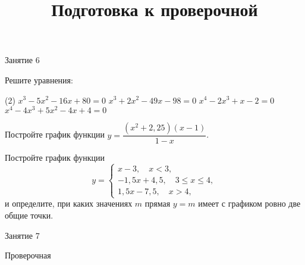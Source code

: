 \begin{class}[number=6]
	\begin{listofex}
		\item Занятие 6
	\end{listofex}
\end{class}

\begin{homework}[number=3]
	\begin{listofex}
		\item Решите уравнения:
		\begin{tasks}(2)
			\task \( x^3-5x^2-16x+80=0 \)
			\task \( x^3+2x^2-49x-98=0 \)
			\task \( x^4-2x^3+x-2=0 \)
			\task \( x^4-4x^3+5x^2-4x+4=0 \)
		\end{tasks}
		\item Постройте график функции \( y=\dfrac{(x^2+2,25)(x-1)}{1-x} \).
		\item Постройте график функции
		\[y= \left\{
		\begin{array}{l}
			x-3, \quad x<3,\\
			-1,5x+4,5,\quad 3\le x\le4,\\
			1,5x-7,5, \quad x>4,
		\end{array}
		\right.\]
		и определите, при каких значениях \( m \) прямая \( y=m \) имеет с графиком ровно две общие точки.
	\end{listofex}
\end{homework}

\begin{class}[number=7]
	\title{Подготовка к проверочной}
	\begin{listofex}
		\item Занятие 7
	\end{listofex}
\end{class}

\begin{exam}
	\begin{listofex}
		\item Проверочная
	\end{listofex}
\end{exam}
